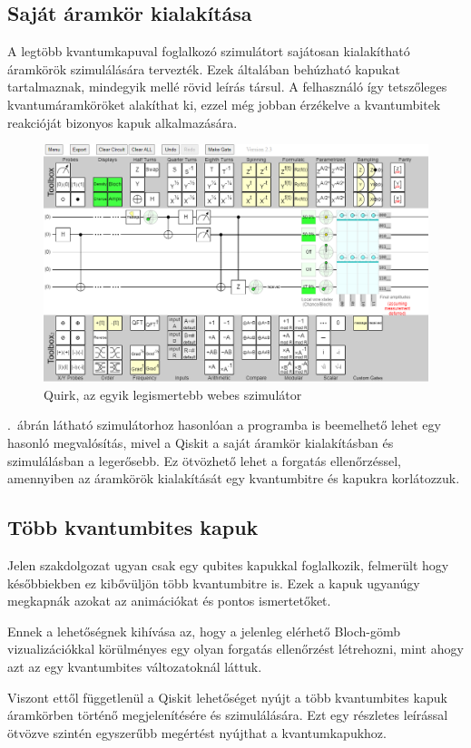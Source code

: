 \documentclass[
]{thesis-ekf}
\theoremstyle{definition}
\theoremstyle{remark}
\begin{document}
\subsection{Saját áramkör kialakítása}
A legtöbb kvantumkapuval foglalkozó szimulátort sajátosan kialakítható áramkörök szimulálására tervezték. Ezek általában behúzható kapukat tartalmaznak, mindegyik mellé rövid leírás társul. A felhasználó így tetszőleges kvantumáramköröket alakíthat ki, ezzel még jobban érzékelve a kvantumbitek reakcióját bizonyos kapuk alkalmazására.

\begin{figure}[H]
	\centering
	\includegraphics[width=0.5\linewidth]{Simulation}
	\caption{Quirk, az egyik legismertebb webes szimulátor}
	\label{fig:simulation}
\end{figure}

\Az{\ref{fig:simulation}}.~ábrán látható szimulátorhoz hasonlóan a programba is beemelhető lehet egy hasonló megvalósítás, mivel a Qiskit a saját áramkör kialakításban és szimulálásban a legerősebb. Ez ötvözhető lehet a forgatás ellenőrzéssel, amennyiben az áramkörök kialakítását egy kvantumbitre és kapukra korlátozzuk.

\subsection{Több kvantumbites kapuk}
Jelen szakdolgozat ugyan csak egy qubites kapukkal foglalkozik, felmerült hogy későbbiekben ez kibővüljön több kvantumbitre is. Ezek a kapuk ugyanúgy megkapnák azokat az animációkat és pontos ismertetőket.

Ennek a lehetőségnek kihívása az, hogy a jelenleg elérhető Bloch-gömb vizualizációkkal körülményes egy olyan forgatás ellenőrzést létrehozni, mint ahogy azt az egy kvantumbites változatoknál láttuk.

Viszont ettől függetlenül a Qiskit lehetőséget nyújt a több kvantumbites kapuk áramkörben történő megjelenítésére és szimulálására. Ezt egy részletes leírással ötvözve szintén egyszerűbb megértést nyújthat a kvantumkapukhoz.
\end{document}
